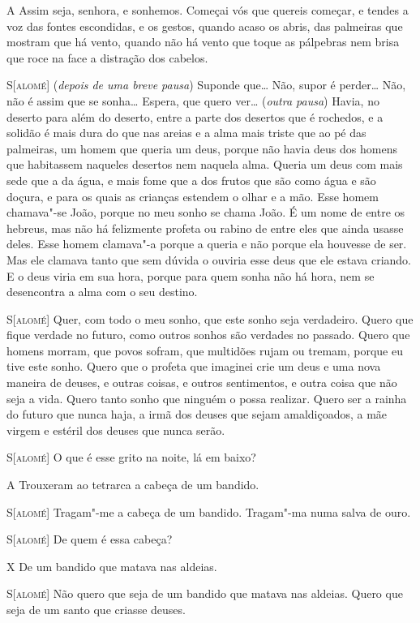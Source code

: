 \textsc{A} Assim seja, senhora, e sonhemos. Começai vós que quereis começar,
e tendes a voz das fontes escondidas, e os gestos, quando acaso os
abris, das palmeiras que mostram que há vento, quando não há vento
que toque as pálpebras nem brisa que roce na face a distração dos
cabelos.

\textsc{S[alomé]} (\textit{depois de uma breve pausa}) Suponde que\ldots{} Não,
supor é perder\ldots{} Não, não é assim que se sonha\ldots{} Espera, que quero
ver\ldots{} (\textit{outra pausa}) Havia, no deserto para além do deserto,
entre a parte dos desertos que é rochedos, e a solidão é mais dura do
que nas areias e a alma mais triste que ao pé das palmeiras, um homem
que queria um deus, porque não havia deus dos homens que habitassem
naqueles desertos nem naquela alma. Queria um deus com mais sede que
a da água, e mais fome que a dos frutos que são como água e são
doçura, e para os quais as crianças estendem o olhar e a mão. Esse
homem chamava"-se João, porque no meu sonho se chama João. É um nome
de entre os hebreus, mas não há felizmente profeta ou rabino de entre
eles que ainda usasse deles. Esse homem clamava"-a porque a queria e
não porque ela houvesse de ser. Mas ele clamava tanto que sem dúvida
o ouviria esse deus que ele estava criando. E o deus viria em sua
hora, porque para quem sonha não há hora, nem se desencontra a alma
com o seu destino. 

\textsc{S[alomé]} Quer, com todo o meu sonho, que este sonho seja verdadeiro.
Quero que fique verdade no futuro, como outros sonhos são verdades no
passado. Quero que homens morram, que povos sofram, que multidões
rujam ou tremam, porque eu tive este sonho. Quero que o profeta que
imaginei crie um deus e uma nova maneira de deuses, e outras coisas,
e outros sentimentos, e outra coisa que não seja a vida. Quero tanto
sonho que ninguém o possa realizar. Quero ser a rainha do futuro que
nunca haja, a irmã dos deuses que sejam amaldiçoados, a mãe virgem e
estéril dos deuses que nunca serão.

\textsc{S[alomé]} O que é esse grito na noite, lá em baixo?

\textsc{A} Trouxeram ao tetrarca a cabeça de um bandido.

\textsc{S[alomé]} Tragam"-me a cabeça de um bandido. Tragam"-ma numa salva de
ouro.

\textsc{S[alomé]} De quem é essa cabeça?

\textsc{X} De um bandido que matava nas aldeias.

\textsc{S[alomé]} Não quero que seja de um bandido que matava nas aldeias.
Quero que seja de um santo que criasse deuses.

